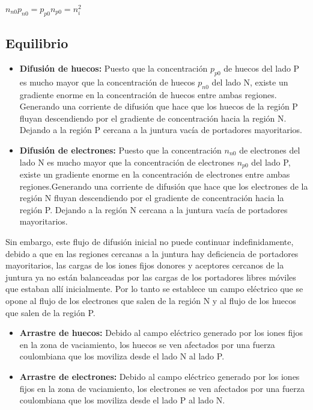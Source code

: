 \documentclass[oneside]{book}
\numberwithin{equation}{section}
\numberwithin{figure}{section}
\numberwithin{table}{section}
\begin{document}
				 \begin{center}
					 $\displaystyle n_{n0}p_{n0}=p_{p0}n_{p0}=n_i^2$
				 \end{center}
			
			\subsection{Equilibrio}
			
				\begin{itemize}
					\item \textbf{Difusión de huecos:} Puesto que la concentración $p_{p0}$ de huecos del lado P es mucho mayor que la concentración de huecos $p_{n0}$ del lado N, existe un gradiente enorme en la concentración de huecos entre ambas regiones. Generando una corriente de difusión que hace que los huecos de la región P fluyan descendiendo por el gradiente de concentración hacia la región N. Dejando a la región P cercana a la juntura vacía de portadores mayoritarios.
					\item \textbf{Difusión de electrones:} Puesto que la concentración $n_{n0}$ de electrones del lado N es mucho mayor que la concentración de electrones $n_{p0}$ del lado P, existe un gradiente enorme en la concentración de electrones entre ambas regiones.Generando una corriente de difusión que hace que los electrones de la región N fluyan descendiendo por el gradiente de concentración hacia la región P. Dejando a la región N cercana a la juntura vacía de portadores mayoritarios.
				\end{itemize}	
				
					Sin embargo, este flujo de difusión inicial no puede continuar indefinidamente, debido a que en las regiones cercanas a la juntura hay deficiencia de portadores mayoritarios, las cargas de los iones fijos donores y aceptores cercanos de la juntura ya no están balanceadas por las cargas de los portadores libres móviles que estaban allí inicialmente. Por lo tanto se establece un campo eléctrico que se opone al flujo de los electrones que salen de la región N y al flujo de los huecos que salen de la región P. 	
				
				\begin{itemize}
					\item \textbf{Arrastre de huecos:} Debido al campo eléctrico generado por los iones fijos en la zona de vaciamiento, los huecos se ven afectados por una fuerza coulombiana que los moviliza desde el lado N al lado P.
					\item \textbf{Arrastre de electrones:} Debido al campo eléctrico generado por los iones fijos en la zona de vaciamiento, los electrones se ven afectados por una fuerza coulombiana que los moviliza desde el lado P al lado N.
				\end{itemize}			
			
\end{document}
